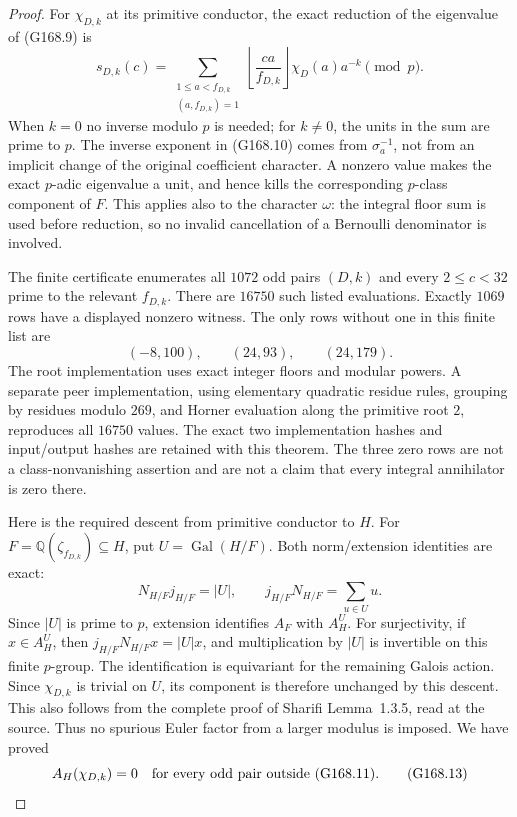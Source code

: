 \begin{proof}
For $\chi_{D,k}$ at its primitive conductor, the exact reduction
of the eigenvalue of (G168.9) is
\[
 s_{D,k}(c)=
 \sum_{\substack{1\leq a<f_{D,k}\\(a,f_{D,k})=1}}
       \left\lfloor\frac{ca}{f_{D,k}}\right\rfloor
                    \chi_D(a)a^{-k}\pmod p.
 \tag{G168.10}
\]
When $k=0$ no inverse modulo $p$ is needed; for $k\ne0$,
the units in the sum are prime to $p$.
The inverse exponent in (G168.10) comes from
$\sigma_a^{-1}$, not from an implicit change of the original
coefficient character.
A nonzero value makes the exact $p$-adic eigenvalue a unit,
and hence kills the corresponding $p$-class component of $F$.
This applies also to the character $\omega$: the integral
floor sum is used before reduction, so no invalid cancellation
of a Bernoulli denominator is involved.

The finite certificate enumerates all $1072$ odd pairs $(D,k)$
and every $2\leq c<32$ prime to the relevant $f_{D,k}$.
There are $16750$ such listed evaluations.
Exactly $1069$ rows have a displayed nonzero witness.
The only rows without one in this finite list are
\[
                   (-8,100),\qquad(24,93),\qquad(24,179).
 \tag{G168.11}
\]
The root implementation uses exact integer floors and modular
powers.  A separate peer implementation, using elementary
quadratic residue rules, grouping by residues modulo $269$,
and Horner evaluation along the primitive root $2$, reproduces
all $16750$ values.  The exact two implementation hashes and
input/output hashes are retained with this theorem.
The three zero rows are not a class-nonvanishing assertion and
are not a claim that every integral annihilator is zero there.

Here is the required descent from primitive conductor to $H$.
For $F=\mathbb Q(\zeta_{f_{D,k}})\subseteq H$, put
$U=\operatorname{Gal}(H/F)$.
Both norm/extension identities are exact:
\[
 N_{H/F}j_{H/F}=|U|,\qquad
             j_{H/F}N_{H/F}=\sum_{u\in U}u.
 \tag{G168.12}
\]
Since $|U|$ is prime to $p$, extension identifies
$A_F$ with $A_H^U$.
For surjectivity, if $x\in A_H^U$, then
$j_{H/F}N_{H/F}x=|U|x$, and multiplication by $|U|$ is
invertible on this finite $p$-group.
The identification is equivariant for the remaining Galois
action.  Since $\chi_{D,k}$ is trivial on $U$, its component
is therefore unchanged by this descent.
This also follows from the complete proof of Sharifi
Lemma~1.3.5, read at the source.
Thus no spurious Euler factor from a larger modulus is imposed.
We have proved
\[
 A_H(\chi_{D,k})=0\quad\hbox{for every odd pair outside (G168.11).}
 \tag{G168.13}
\]


\end{proof}

